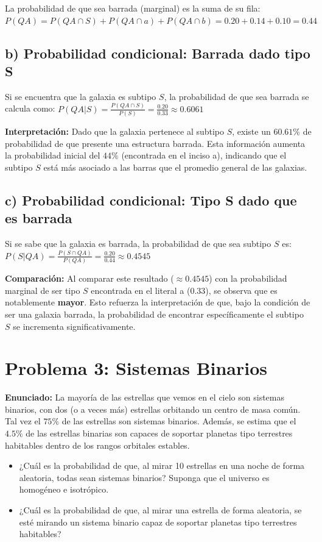 \documentclass[12pt]{article}
\begin{document}
La probabilidad de que sea barrada (marginal) es la suma de su fila:
$P(QA) = P(QA \cap S) + P(QA \cap a) + P(QA \cap b) = 0.20 + 0.14 + 0.10 = \mathbf{0.44}$

\subsection*{b) Probabilidad condicional: Barrada dado tipo S}
Si se encuentra que la galaxia es subtipo $S$, la probabilidad de que sea barrada se calcula como:
$P(QA | S) = \frac{P(QA \cap S)}{P(S)} = \frac{0.20}{0.33} \approx \mathbf{0.6061}$

\textbf{Interpretación:} Dado que la galaxia pertenece al subtipo $S$, existe un $60.61\%$ de probabilidad de que presente una estructura barrada. Esta información aumenta la probabilidad inicial del $44\%$ (encontrada en el inciso a), indicando que el subtipo $S$ está más asociado a las barras que el promedio general de las galaxias.

\subsection*{c) Probabilidad condicional: Tipo S dado que es barrada}
Si se sabe que la galaxia es barrada, la probabilidad de que sea subtipo $S$ es:
$P(S | QA) = \frac{P(S \cap QA)}{P(QA)} = \frac{0.20}{0.44} \approx \mathbf{0.4545}$

\textbf{Comparación:} Al comparar este resultado ($\approx 0.4545$) con la probabilidad marginal de ser tipo $S$ encontrada en el literal a ($0.33$), se observa que es notablemente \textbf{mayor}. Esto refuerza la interpretación de que, bajo la condición de ser una galaxia barrada, la probabilidad de encontrar específicamente el subtipo $S$ se incrementa significativamente.


\section*{Problema 3: Sistemas Binarios}

\textbf{Enunciado:}
La mayoría de las estrellas que vemos en el cielo son sistemas binarios, con dos (o a veces más) estrellas orbitando un centro de masa común. Tal vez el $75\%$ de las estrellas son sistemas binarios. Además, se estima que el $4.5\%$ de las estrellas binarias son capaces de soportar planetas tipo terrestres habitables dentro de los rangos orbitales estables.

\begin{itemize}
    \item[\textbf{a)}] ¿Cuál es la probabilidad de que, al mirar 10 estrellas en una noche de forma aleatoria, todas sean sistemas binarios? Suponga que el universo es homogéneo e isotrópico.
    \item[\textbf{b)}] ¿Cuál es la probabilidad de que, al mirar una estrella de forma aleatoria, se esté mirando un sistema binario capaz de soportar planetas tipo terrestres habitables?
\end{itemize}
\end{document}
